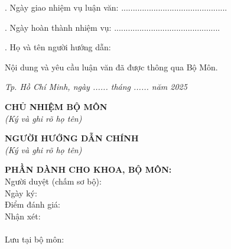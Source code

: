 \vspace{0.4cm}
. Ngày giao nhiệm vụ luận văn: .............................................. 

\vspace{0.2cm}
. Ngày hoàn thành nhiệm vụ: ..............................................

\vspace{0.2cm}
. Họ và tên người hướng dẫn: \TENCANBO

\vspace{0.4cm}
\noindent Nội dung và yêu cầu luận văn đã được thông qua Bộ Môn.

\vspace{0.3cm}
\noindent \hfill \textit{Tp. Hồ Chí Minh, ngày ...... tháng ...... năm 2025}

\vspace{0.5cm}
\begin{center}
\begin{minipage}[t]{0.48\textwidth}
\centering
\textbf{CHỦ NHIỆM BỘ MÔN}\\
\textit{\small (Ký và ghi rõ họ tên)}\\[0.2cm]
\vspace*{2.5cm} %
\end{minipage}
\hfill
\begin{minipage}[t]{0.48\textwidth}
\centering
\textbf{NGƯỜI HƯỚNG DẪN CHÍNH}\\
\textit{\small (Ký và ghi rõ họ tên)}\\[0.2cm]
\vspace*{2.5cm} %
\end{minipage}
\end{center}


\vspace{0.3cm}
\noindent
\begin{minipage}[t]{\textwidth}
\textbf{PHẦN DÀNH CHO KHOA, BỘ MÔN:}\\[0.3cm]
\small
Người duyệt (chấm sơ bộ): \dotfill \\[0.2cm]
Ngày ký: \dotfill \\[0.2cm]
Điểm đánh giá: \dotfill \\[0.2cm]
Nhận xét: \dotfill \\[0.2cm]
\phantom{Nhận xét: } \dotfill \\[0.2cm]
Lưu tại bộ môn: \dotfill
\end{minipage}
